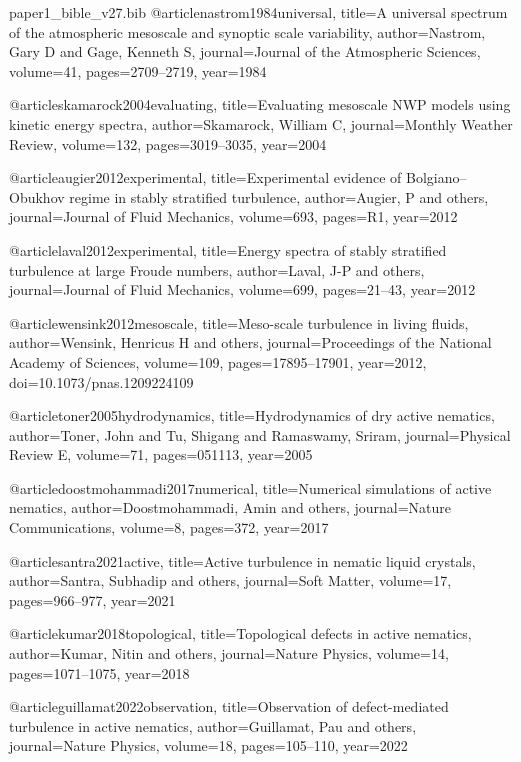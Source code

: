\begin{filecontents}[overwrite]{paper1_bible_v27.bib}
@article{nastrom1984universal,
  title={A universal spectrum of the atmospheric mesoscale and synoptic scale variability},
  author={Nastrom, Gary D and Gage, Kenneth S},
  journal={Journal of the Atmospheric Sciences},
  volume={41},
  pages={2709--2719},
  year={1984}
}

@article{skamarock2004evaluating,
  title={Evaluating mesoscale {NWP} models using kinetic energy spectra},
  author={Skamarock, William C},
  journal={Monthly Weather Review},
  volume={132},
  pages={3019--3035},
  year={2004}
}

@article{augier2012experimental,
  title={Experimental evidence of Bolgiano--Obukhov regime in stably stratified turbulence},
  author={Augier, P and others},
  journal={Journal of Fluid Mechanics},
  volume={693},
  pages={R1},
  year={2012}
}

@article{laval2012experimental,
  title={Energy spectra of stably stratified turbulence at large {F}roude numbers},
  author={Laval, J-P and others},
  journal={Journal of Fluid Mechanics},
  volume={699},
  pages={21--43},
  year={2012}
}

@article{wensink2012mesoscale,
  title={Meso-scale turbulence in living fluids},
  author={Wensink, Henricus H and others},
  journal={Proceedings of the National Academy of Sciences},
  volume={109},
  pages={17895--17901},
  year={2012},
  doi={10.1073/pnas.1209224109}
}

@article{toner2005hydrodynamics,
  title={Hydrodynamics of dry active nematics},
  author={Toner, John and Tu, Shigang and Ramaswamy, Sriram},
  journal={Physical Review E},
  volume={71},
  pages={051113},
  year={2005}
}

@article{doostmohammadi2017numerical,
  title={Numerical simulations of active nematics},
  author={Doostmohammadi, Amin and others},
  journal={Nature Communications},
  volume={8},
  pages={372},
  year={2017}
}

@article{santra2021active,
  title={Active turbulence in nematic liquid crystals},
  author={Santra, Subhadip and others},
  journal={Soft Matter},
  volume={17},
  pages={966--977},
  year={2021}
}

@article{kumar2018topological,
  title={Topological defects in active nematics},
  author={Kumar, Nitin and others},
  journal={Nature Physics},
  volume={14},
  pages={1071--1075},
  year={2018}
}

@article{guillamat2022observation,
  title={Observation of defect-mediated turbulence in active nematics},
  author={Guillamat, Pau and others},
  journal={Nature Physics},
  volume={18},
  pages={105--110},
  year={2022}
}


\end{filecontents}
